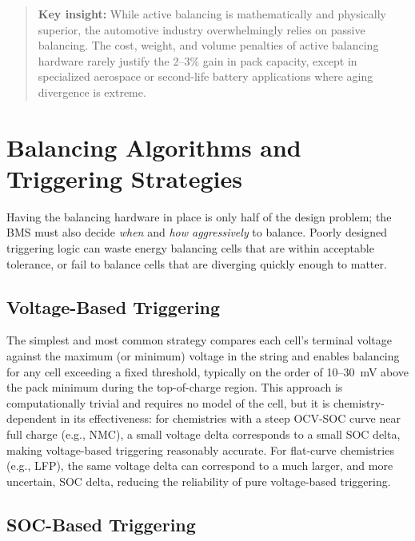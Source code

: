 \begin{quote}
\textbf{Key insight:} While active balancing is mathematically and physically superior, the automotive industry overwhelmingly relies on passive balancing. The cost, weight, and volume penalties of active balancing hardware rarely justify the 2--3\% gain in pack capacity, except in specialized aerospace or second-life battery applications where aging divergence is extreme.
\end{quote}

\section{Balancing Algorithms and Triggering Strategies}
\label{sec:14_balancing_algorithms}

Having the balancing hardware in place is only half of the design problem; the BMS must also decide \emph{when} and \emph{how aggressively} to balance. Poorly designed triggering logic can waste energy balancing cells that are within acceptable tolerance, or fail to balance cells that are diverging quickly enough to matter.

\subsection{Voltage-Based Triggering}
\label{subsec:14_voltage_trigger}

The simplest and most common strategy compares each cell's terminal voltage against the maximum (or minimum) voltage in the string and enables balancing for any cell exceeding a fixed threshold, typically on the order of 10–30~mV above the pack minimum during the top-of-charge region. This approach is computationally trivial and requires no model of the cell, but it is chemistry-dependent in its effectiveness: for chemistries with a steep OCV-SOC curve near full charge (e.g., NMC), a small voltage delta corresponds to a small SOC delta, making voltage-based triggering reasonably accurate. For flat-curve chemistries (e.g., LFP), the same voltage delta can correspond to a much larger, and more uncertain, SOC delta, reducing the reliability of pure voltage-based triggering.

\subsection{SOC-Based Triggering}
\label{subsec:14_soc_trigger}

